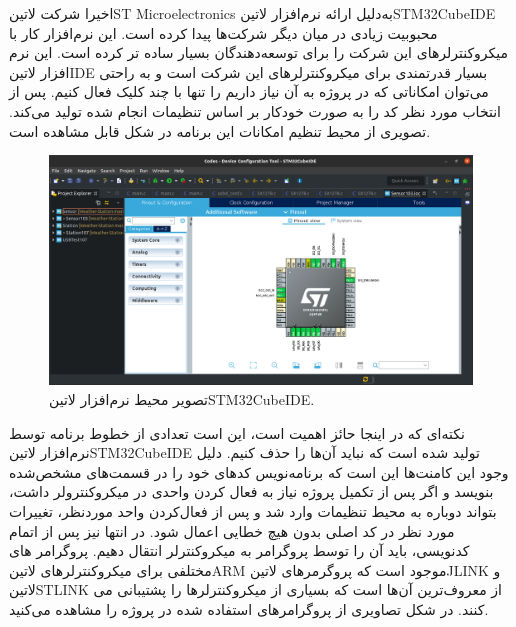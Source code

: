 اخیرا شرکت ‌لاتین{ST Microelectronics} به‌دلیل ارائه نر‌م‌افزار ‌لاتین{STM32CubeIDE} محبوبیت زیادی در میان دیگر شرکت‌ها پیدا کرده است. این نرم‌افزار کار با میکروکنترلرهای این شرکت را برای توسعه‌دهندگان بسیار ساده تر کرده است. این نرم افزار ‌لاتین{IDE} بسیار قدرتمندی برای میکروکنترلر‌های این شرکت است و به راحتی می‌توان امکاناتی که در پروژه به آن نیاز داریم را تنها با چند کلیک فعال کنیم. پس از انتخاب مورد نظر کد را به صورت خودکار بر اساس تنظیمات انجام شده تولید می‌کند. تصویری از محیط تنظیم امکانات این برنامه در شکل  قابل مشاهده است.

\begin{figure}[!h]
	\centering
	\includegraphics[width=\linewidth]{Assets/stm32cubeide.png}
	\caption{تصویر محیط نرم‌افزار ‌لاتین{STM32CubeIDE}.}
	\label{fig:stm32cubeide}
\end{figure}

نکته‌‌ای که در اینجا حائز  اهمیت است، این است تعدادی از خطوط برنامه توسط نرم‌افزار ‌لاتین{STM32CubeIDE} تولید شده است که نباید آن‌ها را حذف کنیم. دلیل وجود این کامنت‌ها این است که برنامه‌نویس کدهای خود را در قسمت‌های مشخص‌‌شده بنویسد و اگر پس از تکمیل پروژه نیاز به فعال کردن واحدی در میکروکنترولر داشت، بتواند دوباره به محیط تنظیمات وارد شد و پس از فعال‌کردن واحد موردنظر، تغییرات مورد نظر در کد اصلی بدون هیچ خطایی اعمال شود. در انتها نیز پس از اتمام کدنویسی، باید آن را توسط پروگرامر به میکروکنترلر انتقال دهیم. پروگرامر های مختلفی برای میکروکنترلرهای ‌لاتین{ARM} موجود است که پروگرمرهای ‌لاتین{JLINK} و ‌لاتین{STLINK} از  معروف‌ترین آن‌ها است که بسیاری از میکروکنترلرها را پشتیبانی می ‌کنند.
در شکل  تصاویری از پروگرامر‌های استفاده شده در پروژه را مشاهده می‌‌کنید.

